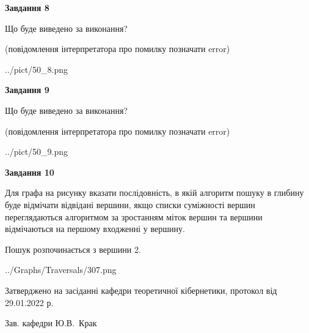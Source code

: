 \documentclass[12pt, ukrainian]{article}
\begin{document}
{\begin {large}
{\begin {center}\textbf{Завдання 8}\end {center}}\par
Що буде виведено за виконання?\par
 (повідомлення інтерпретатора про помилку позначати error)\par
\begin{center}
	{../pict/50_8.png}
\end{center}
\newpage

{\begin {center}\textbf{Завдання 9}\end {center}}\par
Що буде виведено за виконання?\par
 (повідомлення інтерпретатора про помилку позначати error)\par
\begin{center}
	{../pict/50_9.png}
\end{center}
\newpage

{\begin {center}\textbf{Завдання 10}\end {center}}\par
Для графа на рисунку вказати послідовність, в якій алгоритм пошуку в глибину буде відмічати відвідані вершини, якщо списки суміжності вершин переглядаються алгоритмом за зростанням міток вершин та вершини відмічаються на першому вход\-женні у вершину.\par
Пошук розпочинається з вершини 2.\par

\begin{center}
	{../Graphs/Traversals/307.png}
\end{center}\par
\newpage


\end {large}
}
{\smallskip \begin {small} Затверджено на засіданні кафедри теоретичної кібернетики, протокол  від   29.01.2022 р.\par\smallskip\smallskip
{\parbox {6.5 cm}{Зав. кафедри \dotfill Ю.В.~Крак}} \end{small}}
\end{document}

